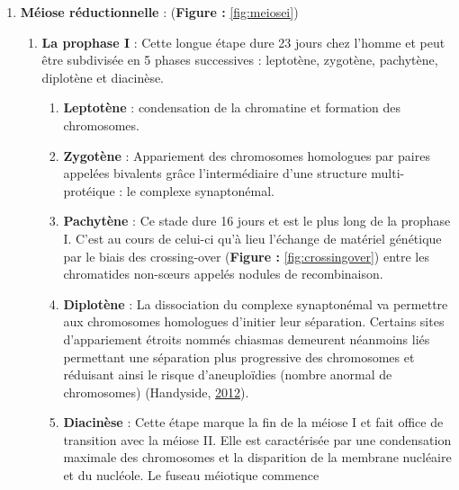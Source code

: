 \documentclass[12pt,twoside]{reedthesis}
\providecommand{\tightlist}{%
  \setlength{\itemsep}{0pt}\setlength{\parskip}{0pt}}
\theoremstyle{definition}
\theoremstyle{definition}
\theoremstyle{remark}
\begin{document}
  \begin{enumerate}
  \def\labelenumi{\arabic{enumi}.}
  \tightlist
  \item
    \textbf{Méiose réductionnelle} : (\textbf{Figure : }\ref{fig:meiosei})
  
    \begin{enumerate}
    \def\labelenumii{\alph{enumii}.}
    \tightlist
    \item
      \textbf{La prophase I} : Cette longue étape dure 23 jours chez
      l'homme et peut être subdivisée en 5 phases successives : leptotène,
      zygotène, pachytène, diplotène et diacinèse.
  
      \begin{enumerate}
      \def\labelenumiii{\roman{enumiii}.}
      \tightlist
      \item
        \textbf{Leptotène} : condensation de la chromatine et formation
        des chromosomes.\\
      \item
        \textbf{Zygotène} : Appariement des chromosomes homologues par
        paires appelées bivalents grâce l'intermédiaire d'une structure
        multi-protéique : le complexe synaptonémal.\\
      \item
        \textbf{Pachytène} : Ce stade dure 16 jours et est le plus long de
        la prophase I. C'est au cours de celui-ci qu'à lieu l'échange de
        matériel génétique par le biais des crossing-over (\textbf{Figure
        : }\ref{fig:crossingover}) entre les chromatides non-sœurs appelés
        nodules de recombinaison.\\
      \item
        \textbf{Diplotène} : La dissociation du complexe synaptonémal va
        permettre aux chromosomes homologues d'initier leur séparation.
        Certains sites d'appariement étroits nommés chiasmas demeurent
        néanmoins liés permettant une séparation plus progressive des
        chromosomes et réduisant ainsi le risque d'aneuploïdies (nombre
        anormal de chromosomes) (Handyside,
        \protect\hyperlink{ref-Handyside2012}{2012}).\\
      \item
        \textbf{Diacinèse} : Cette étape marque la fin de la méiose I et
        fait office de transition avec la méiose II. Elle est caractérisée
        par une condensation maximale des chromosomes et la disparition de
        la membrane nucléaire et du nucléole. Le fuseau méiotique commence

\end{enumerate}
\end{enumerate}
\end{enumerate}
\end{document}
